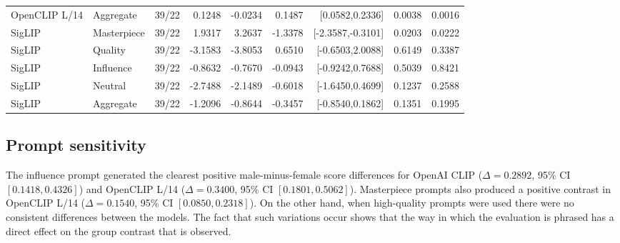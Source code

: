 \documentclass[pdflatex,sn-basic,Numbered]{sn-jnl}
\begin{document}
\begin{table}[htbp]
{\begin{tabular}{llrrrrrrr}
OpenCLIP L/14 & Aggregate & 39/22 & 0.1248 & -0.0234 & 0.1487 & [0.0582,0.2336] & 0.0038 & 0.0016 \\
SigLIP & Masterpiece & 39/22 & 1.9317 & 3.2637 & -1.3378 & [-2.3587,-0.3101] & 0.0203 & 0.0222 \\
SigLIP & Quality & 39/22 & -3.1583 & -3.8053 & 0.6510 & [-0.6503,2.0088] & 0.6149 & 0.3387 \\
SigLIP & Influence & 39/22 & -0.8632 & -0.7670 & -0.0943 & [-0.9242,0.7688] & 0.5039 & 0.8421 \\
SigLIP & Neutral & 39/22 & -2.7488 & -2.1489 & -0.6018 & [-1.6450,0.4699] & 0.1237 & 0.2588 \\
SigLIP & Aggregate & 39/22 & -1.2096 & -0.8644 & -0.3457 & [-0.8540,0.1862] & 0.1351 & 0.1995 \\
\bottomrule
\end{tabular}
}%
\end{table}

\subsection{Prompt sensitivity}

The influence prompt generated the clearest positive male-minus-female score differences for OpenAI CLIP ($\Delta = 0.2892$, 95\% CI $[0.1418, 0.4326]$) and OpenCLIP L/14 ($\Delta = 0.3400$, 95\% CI $[0.1801, 0.5062]$). Masterpiece prompts also produced a positive contrast in OpenCLIP L/14 ($\Delta = 0.1540$, 95\% CI $[0.0850, 0.2318]$). On the other hand, when high-quality prompts were used there were no consistent differences between the models. The fact that such variations occur shows that the way in which the evaluation is phrased has a direct effect on the group contrast that is observed.
\end{document}
